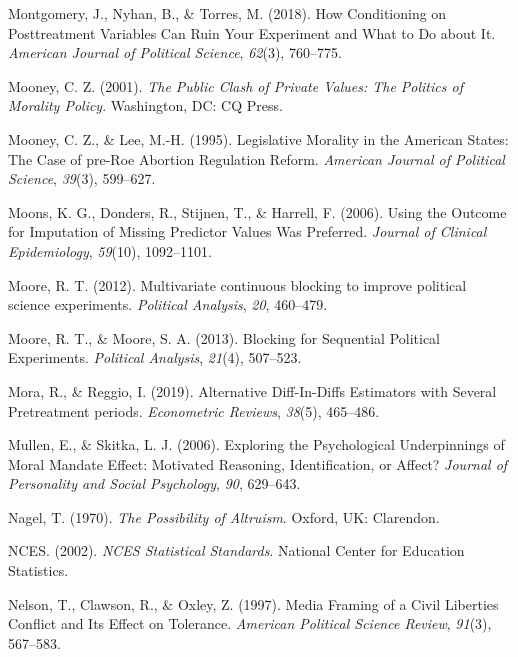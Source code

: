 \documentclass[12pt,econ]{sources/authesis}
\begin{document}
\leavevmode\hypertarget{ref-montgomery_1962_conditioning}{}%
Montgomery, J., Nyhan, B., \& Torres, M. (2018). How Conditioning on Posttreatment Variables Can Ruin Your Experiment and What to Do about It. \emph{American Journal of Political Science}, \emph{62}(3), 760--775.

\leavevmode\hypertarget{ref-mooney_public_2001}{}%
Mooney, C. Z. (2001). \emph{The Public Clash of Private Values: The Politics of Morality Policy}. Washington, DC: CQ Press.

\leavevmode\hypertarget{ref-mooney_1995_legislative}{}%
Mooney, C. Z., \& Lee, M.-H. (1995). Legislative Morality in the American States: The Case of pre-Roe Abortion Regulation Reform. \emph{American Journal of Political Science}, \emph{39}(3), 599--627.

\leavevmode\hypertarget{ref-moons_2006_using}{}%
Moons, K. G., Donders, R., Stijnen, T., \& Harrell, F. (2006). Using the Outcome for Imputation of Missing Predictor Values Was Preferred. \emph{Journal of Clinical Epidemiology}, \emph{59}(10), 1092--1101.

\leavevmode\hypertarget{ref-moore_2012_multivariate}{}%
Moore, R. T. (2012). Multivariate continuous blocking to improve political science experiments. \emph{Political Analysis}, \emph{20}, 460--479.

\leavevmode\hypertarget{ref-moore_blocking_2013}{}%
Moore, R. T., \& Moore, S. A. (2013). Blocking for Sequential Political Experiments. \emph{Political Analysis}, \emph{21}(4), 507--523.

\leavevmode\hypertarget{ref-mora_2019_alternative}{}%
Mora, R., \& Reggio, I. (2019). Alternative Diff-In-Diffs Estimators with Several Pretreatment periods. \emph{Econometric Reviews}, \emph{38}(5), 465--486.

\leavevmode\hypertarget{ref-mullen_2006_exploring}{}%
Mullen, E., \& Skitka, L. J. (2006). Exploring the Psychological Underpinnings of Moral Mandate Effect: Motivated Reasoning, Identification, or Affect? \emph{Journal of Personality and Social Psychology}, \emph{90}, 629--643.

\leavevmode\hypertarget{ref-nagel_1970_possibility}{}%
Nagel, T. (1970). \emph{The Possibility of Altruism}. Oxford, UK: Clarendon.

\leavevmode\hypertarget{ref-education-statistics_2002_nces}{}%
NCES. (2002). \emph{NCES Statistical Standards}. National Center for Education Statistics.

\leavevmode\hypertarget{ref-nelson_media_1997}{}%
Nelson, T., Clawson, R., \& Oxley, Z. (1997). Media Framing of a Civil Liberties Conflict and Its Effect on Tolerance. \emph{American Political Science Review}, \emph{91}(3), 567--583.
\end{document}
